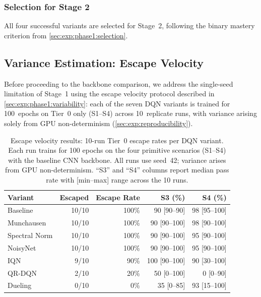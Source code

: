 \subsubsection{Selection for Stage 2}

All four successful variants are selected for Stage~2, following the binary mastery criterion from \cref{sec:exp:phase1:selection}.

\subsection{Variance Estimation: Escape Velocity}
\label{sec:res:variance}

Before proceeding to the backbone comparison, we address the single-seed limitation of Stage~1 using the escape velocity protocol described in \cref{sec:exp:phase1:variability}: each of the seven DQN variants is trained for 100~epochs on Tier~0 only (S1--S4) across 10~replicate runs, with variance arising solely from GPU non-determinism (\cref{sec:exp:reproducibility}).

\begin{table}[H]
  \centering
  \caption{Escape velocity results: 10-run Tier~0 escape rates per DQN variant. Each run trains for 100 epochs on the four primitive scenarios (S1--S4) with the baseline CNN backbone. All runs use seed~42; variance arises from GPU non-determinism. ``S3'' and ``S4'' columns report median pass rate with [min--max] range across the 10 runs.}
  \label{tab:res:escape_rates}
  \begin{tabular}{@{} l r r r r @{}}
    \toprule
    \textbf{Variant} & \textbf{Escaped} & \textbf{Escape Rate} & \textbf{S3 (\%)} & \textbf{S4 (\%)} \\
    \midrule
    Baseline       & 10/10 & 100\% & 90 [90--90] & 98 [95--100] \\
    Munchausen     & 10/10 & 100\% & 90 [90--100] & 98 [90--100] \\
    Spectral Norm  & 10/10 & 100\% & 90 [90--100] & 95 [90--100] \\
    NoisyNet       & 10/10 & 100\% & 90 [90--100] & 95 [90--100] \\
    \midrule
    IQN            &  9/10 &  90\% & 100 [90--100] & 90 [30--100] \\
    QR-DQN         &  2/10 &  20\% & 50 [0--100] & 0 [0--90] \\
    Dueling        &  0/10 &   0\% & 35 [0--85] & 93 [15--100] \\
    \bottomrule
  \end{tabular}
\end{table}

